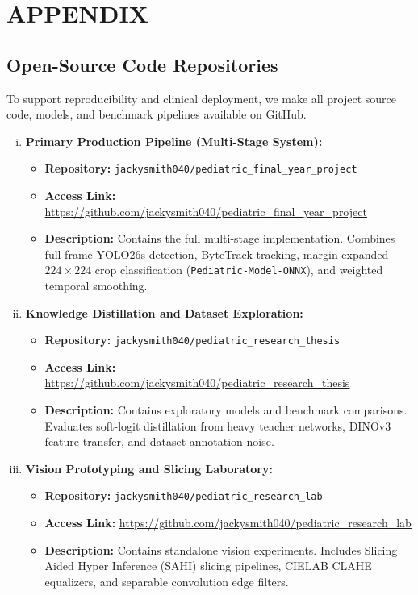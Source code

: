 \chapter{APPENDIX}

\section{Open-Source Code Repositories}
To support reproducibility and clinical deployment, we make all project source code, models, and benchmark pipelines available on GitHub.

\begin{enumerate}[(i)]
    \item \textbf{Primary Production Pipeline (Multi-Stage System):}
    \begin{itemize}
        \item \textbf{Repository:} \nolinkurl{jackysmith040/pediatric_final_year_project}
        \item \textbf{Access Link:} \url{https://github.com/jackysmith040/pediatric_final_year_project}
        \item \textbf{Description:} Contains the full multi-stage implementation. Combines full-frame YOLO26s detection, ByteTrack tracking, margin-expanded $224 \times 224$ crop classification (\texttt{Pediatric-Model-ONNX}), and weighted temporal smoothing.
    \end{itemize}

    \item \textbf{Knowledge Distillation and Dataset Exploration:}
    \begin{itemize}
        \item \textbf{Repository:} \nolinkurl{jackysmith040/pediatric_research_thesis}
        \item \textbf{Access Link:} \url{https://github.com/jackysmith040/pediatric_research_thesis}
        \item \textbf{Description:} Contains exploratory models and benchmark comparisons. Evaluates soft-logit distillation from heavy teacher networks, DINOv3 feature transfer, and dataset annotation noise.
    \end{itemize}

    \item \textbf{Vision Prototyping and Slicing Laboratory:}
    \begin{itemize}
        \item \textbf{Repository:} \nolinkurl{jackysmith040/pediatric_research_lab}
        \item \textbf{Access Link:} \url{https://github.com/jackysmith040/pediatric_research_lab}
        \item \textbf{Description:} Contains standalone vision experiments. Includes Slicing Aided Hyper Inference (SAHI) slicing pipelines, CIELAB CLAHE equalizers, and separable convolution edge filters.
    \end{itemize}


\end{enumerate}
